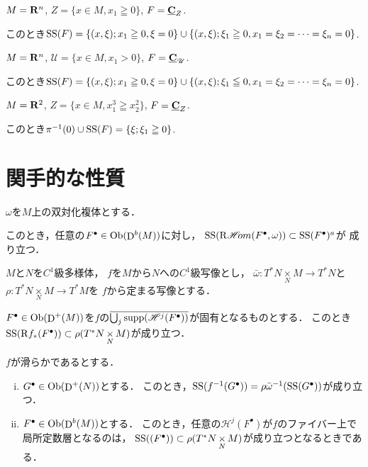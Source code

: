 \begin{EG}
    \(M=\mathbf{R}^n\), \(Z=\{x\in M, x_1\geqq0\}\), \(F=\underline{\mathbf{C}}_Z\). 
    
    このとき\(\mathop{\mathrm{SS}}\nolimits(F)=\{(x,\xi);x_1\geqq0,\xi=0\}\cup\{(x,\xi);\xi_1\geqq0,x_1=\xi_2=\dots=\xi_n=0\}\).
\end{EG}

\begin{EG}
    \(M=\mathbf{R}^n\), \(\mathscr{U}=\{x\in M, x_1>0\}\), \(F=\underline{\mathbf{C}}_\mathscr{U}\). 
    
    このとき\(\mathop{\mathrm{SS}}\nolimits(F)=\{(x,\xi);x_1\geqq0,\xi=0\}\cup\{(x,\xi);\xi_1\leqq0,x_1=\xi_2=\dots=\xi_n=0\}\).
\end{EG}

\begin{EG}
    \(M=\mathbf{R}^2\), \(Z=\{x\in M, x_1^3\geqq x_2^2\}\), \(F=\underline{\mathbf{C}}_Z\). 
    
    このとき\(\pi^{-1}(0)\cup\mathop{\mathrm{SS}}\nolimits(F)=\{\xi;\xi_1\geqq0\}\).
\end{EG}

\section{関手的な性質}

\begin{PRP}
    \(\omega\)を\(M\)上の双対化複体とする．

    このとき，任意の\(F^\bullet\in\mathop{\textrm{Ob}}\nolimits(\mathop{\mathrm{D}}\nolimits^b(M))\)に対し，
    \(\mathop{\mathrm{SS}}\nolimits(\mathop{\mathrm{R}\hspace{-1.5pt}\mathop{\mathscr{H}\hspace{-2pt}om}\nolimits}\nolimits(F^\bullet,\omega))\subset\mathop{\mathrm{SS}}\nolimits(F^\bullet)^a\)が
    成り立つ．
\end{PRP}

\(M\)と\(N\)を\(C^1\)級多様体，
\(f\)を\(M\)から\(N\)への\(C^1\)級写像とし，
\(\bar{\omega}\colon T^\ast N\mathop{\times}\limits_N M\to T^\ast N\)と
\(\rho\colon T^\ast N\mathop{\times}\limits_N M\to T^\ast M\)を
\(f\)から定まる写像とする．

\begin{PRP}
    \(F^\bullet\in\mathop{\textrm{Ob}}\nolimits(\mathop{\mathrm{D}}\nolimits^+(M))\)を\(f\)の\(\overline{\bigcup_j\mathop{\mathrm{supp}}\nolimits(\mathscr{H}^j(F^\bullet))}\)が固有となるものとする．
    このとき\(\mathop{\mathrm{SS}}\nolimits(\mathrm{R}f_\ast(F^\bullet))\subset\rho(T^\ast N\mathop{\times}\limits_NM)\)が成り立つ．
\end{PRP}

\begin{PRP}
    \(f\)が滑らかであるとする．
    \begin{enumerate}[(i)]
        \item \(G^\bullet\in\mathop{\textrm{Ob}}\nolimits(\mathop{\mathrm{D}}\nolimits^+(N))\)とする．
        このとき，\(\mathop{\mathrm{SS}}\nolimits(f^{-1}(G^\bullet))=\rho\bar{\omega}^{-1}(\mathop{\mathrm{SS}}\nolimits(G^\bullet))\)が成り立つ．
        \item \(F^\bullet\in\mathop{\textrm{Ob}}\nolimits(\mathop{\mathrm{D}}\nolimits^b(M))\)とする．
        このとき，任意の\(\mathscr{H}^j(F^\bullet)\)が\(f\)のファイバー上で
        局所定数層となるのは，
        \(\mathop{\mathrm{SS}}\nolimits((F^\bullet))\subset\rho(T^\ast N\mathop{\times}\limits_N M)\)が成り立つとなるときである．
    \end{enumerate}
\end{PRP}

